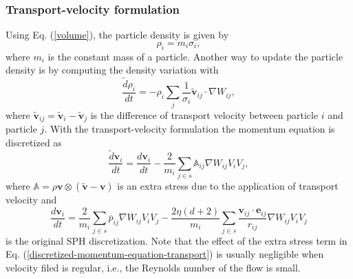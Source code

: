 \documentclass[12pt, a4paper,onecolumn]{article}
\begin{document}
\subsubsection{Transport-velocity formulation}
Using Eq. (\ref{volume}), the particle density is given by
%
\begin{equation}\label{density_summation}
\rho_{i} = m_{i}\sigma_{i},
\end{equation}
%
where $m_i$ is the constant mass of a particle.
Another way to update the particle density is by computing the density variation with
%
\begin{equation}
\frac{\widetilde{d}\rho_{i}}{dt}= -  \rho_{i}\sum_j \frac{1}{\sigma_i} \widetilde{\mathbf{v}}_{ij} \cdot  \nabla W_{ij},
\label{density-variation}
\end{equation}
%
where $\widetilde{\mathbf{v}}_{ij} = \widetilde{\mathbf{v}}_{i} - \widetilde{\mathbf{v}}_{j}$ is the difference of transport velocity between particle $i$ and particle $j$.
With the transport-velocity formulation \cite{adami2013transport}
the momentum equation is discretized as 
%
\begin{equation}
\frac{\widetilde{d}\mathbf{v}_{i}}{dt} =  \frac{d \mathbf{v}_{i}}{dt} - \frac{2}{m_i}\sum_{j\in s}  \mathbb{A}_{ij} \nabla W_{ij} V_i V_j,
\label{discretized-momentum-equation-transport}
\end{equation}
%
where $\mathbb{A} = \rho \mathbf{v}\otimes \left(\widetilde{\mathbf{v}} - \mathbf{v} \right)$ is an extra stress due to the application of transport velocity and
%
\begin{equation}
\frac{d \mathbf{v}_{i}}{dt} =  \frac{2}{m_i}\sum_{j\in s}  \overline{p}_{ij} \nabla W_{ij} V_i V_j
- \frac{2\eta(d+2)}{m_i}\sum_{j\in s}\frac{\mathbf{v}_{ij}\cdot \mathbf{e}_{ij}}{r_{ij}} \nabla W_{ij}  V_i V_j
\label{discretized-momentum-equation}
\end{equation}
%
is the original SPH discretization.
Note that the effect of the extra stress term in Eq. (\ref{discretized-momentum-equation-transport}) 
is usually negligible when velocity filed is regular, i.e., the Reynolds number of the flow is small.
%
\end{document}

